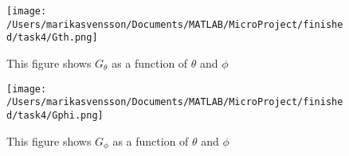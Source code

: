\begin{figure}[h]
\centering
\texttt{[image: /Users/marikasvensson/Documents/MATLAB/MicroProject/finished/task4/Gth.png]}
\caption{This figure shows $G_\theta$ as a function of $\theta$ and $\phi$}
\label{task4:Gth}
\end{figure}


\begin{figure}[h]
\centering
\texttt{[image: /Users/marikasvensson/Documents/MATLAB/MicroProject/finished/task4/Gphi.png]}
\caption{This figure shows $G_\phi$ as a function of $\theta$ and $\phi$}
\label{task4:Gphi}
\end{figure}

